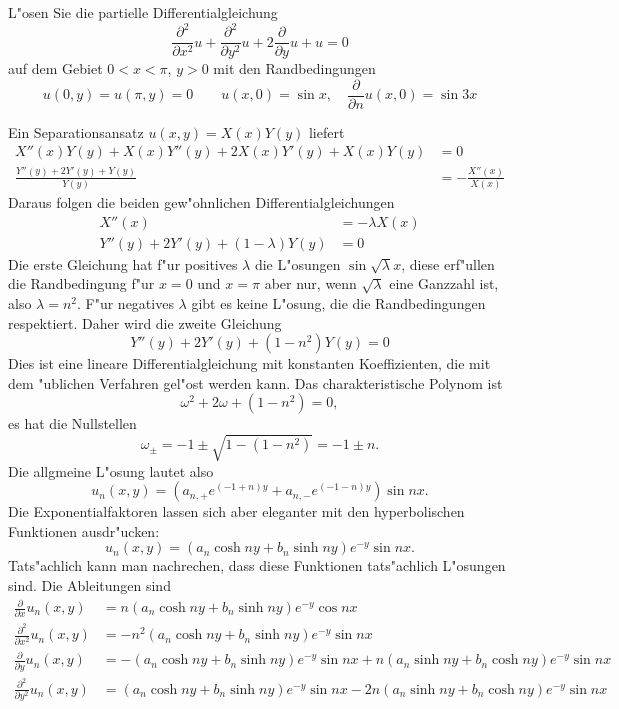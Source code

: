 L"osen Sie die partielle Differentialgleichung
\[
\frac{\partial^2}{\partial x^2}u+\frac{\partial^2}{\partial y^2}u
+2\frac{\partial }{\partial y}u+u=0
\]
auf dem Gebiet $0 < x < \pi$, $y > 0$ mit den Randbedingungen
\[
u(0,y)=u(\pi,y)=0
\quad
\quad
u(x,0)=\sin x,\quad \frac{\partial }{\partial n}u(x,0)=\sin 3x
\]

\begin{loesung}
Ein Separationsansatz $u(x,y)=X(x)Y(y)$ liefert
\begin{align*}
X''(x)Y(y)+X(x)Y''(y)+2X(x)Y'(y)+X(x)Y(y)&=0
\\
\frac{Y''(y)+2Y'(y)+Y(y)}{Y(y)}
&=
-\frac{X''(x)}{X(x)}
\end{align*}
Daraus folgen die beiden gew"ohnlichen Differentialgleichungen
\begin{align*}
X''(x)&=-\lambda X(x)\\
Y''(y)+2Y'(y)+(1-\lambda)Y(y)&=0
\end{align*}
Die erste Gleichung hat f"ur positives $\lambda$ die L"osungen
$\sin\sqrt{\lambda}x$, diese erf"ullen die Randbedingung f"ur $x=0$
und $x=\pi$ aber nur, wenn $\sqrt{\lambda}$ eine Ganzzahl ist, also
$\lambda=n^2$. F"ur negatives $\lambda$ gibt es keine L"osung,
die die Randbedingungen respektiert. Daher wird die zweite Gleichung
\[
Y''(y)+2Y'(y)+(1-n^2)Y(y)=0
\]
Dies ist eine lineare Differentialgleichung mit konstanten
Koeffizienten, die mit dem "ublichen Verfahren gel"ost werden
kann. Das charakteristische Polynom ist
\[
\omega^2+2\omega+(1-n^2)=0,
\]
es hat die Nullstellen
\[
\omega_{\pm}=-1\pm{\sqrt{1-(1-n^2)}}=-1\pm n.
\]
Die allgmeine L"osung lautet also
\[
u_n(x,y)=(a_{n,+}e^{(-1+n)y}+a_{n,-}e^{(-1-n)y})\sin nx.
\]
Die Exponentialfaktoren lassen sich aber eleganter
mit den hyperbolischen Funktionen ausdr"ucken:
\[
u_n(x,y)=(a_n\cosh ny+b_n\sinh ny)e^{-y}\sin nx.
\]
Tats"achlich kann man nachrechen, dass diese Funktionen
tats"achlich L"osungen sind. Die Ableitungen sind
\begin{align*}
\frac{\partial}{\partial x}u_n(x,y)
&=
n (a_n\cosh ny+b_n\sinh ny)e^{-y}\cos nx
\\
\frac{\partial^2}{\partial x^2}u_n(x,y)
&=
-n^2 (a_n\cosh ny+b_n\sinh ny)e^{-y}\sin nx
\\
\frac{\partial}{\partial y}u_n(x,y)
&=
-(a_n\cosh ny+b_n\sinh ny)e^{-y}\sin nx
+
n(a_n\sinh ny+b_n\cosh ny)e^{-y}\sin nx
\\
\frac{\partial^2}{\partial y^2}u_n(x,y)
&=
(a_n\cosh ny+b_n\sinh ny)e^{-y}\sin nx
-2n(a_n\sinh ny+b_n\cosh ny)e^{-y}\sin nx
\\

\end{align*}
\end{loesung}
